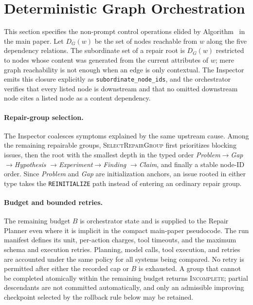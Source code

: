 \section{Deterministic Graph Orchestration}
\label{app:orchestration}

This section specifies the non-prompt control operations elided by
Algorithm~ in the main paper. Let $D_G(w)$ be the set of nodes
reachable from $w$ along the five dependency relations. The subordinate set of
a repair root is $D_G(w)$ restricted to nodes whose content was generated from
the current attributes of $w$; mere graph reachability is not enough when an
edge is only contextual. The Inspector emits this closure explicitly as
\texttt{subordinate\_node\_ids}, and the orchestrator verifies that every listed
node is downstream and that no omitted downstream node cites a listed node as a
content dependency.

\paragraph{Repair-group selection.}
The Inspector coalesces symptoms explained by the same upstream cause. Among
the remaining repairable groups, \textsc{SelectRepairGroup} first prioritizes
blocking issues, then the root with the smallest depth in the typed order
\textit{Problem}$\rightarrow$\textit{Gap}$\rightarrow$\textit{Hypothesis}
$\rightarrow$\textit{Experiment}$\rightarrow$\textit{Finding}
$\rightarrow$\textit{Claim}, and finally a stable node-ID order. Since
\textit{Problem} and \textit{Gap} are initialization anchors, an issue rooted
in either type takes the \texttt{REINITIALIZE} path instead of entering an
ordinary repair group.

\paragraph{Budget and bounded retries.}
The remaining budget $B$ is orchestrator state and is supplied to the Repair
Planner even where it is implicit in the compact main-paper pseudocode. The run
manifest defines its unit, per-action charges, tool timeouts, and the maximum
schema and execution retries. Planning, model calls, tool execution, and
retries are accounted under the same policy for all systems being compared.
No retry is permitted after either the recorded cap or $B$ is exhausted. A
group that cannot be completed atomically within the remaining budget returns
\textsc{Incomplete}; partial descendants are not committed automatically, and
only an admissible improving checkpoint selected by the rollback rule below may
be retained.

